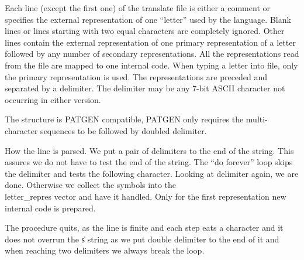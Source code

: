 Each line (except the first one) of the translate file is either a
comment or specifies the external representation of one ``letter'' used
by the language. Blank lines or lines starting with two equal characters
are completely ignored. Other lines contain the external representation
of one primary representation of a letter followed by any number of
secondary representations. All the representations read from the file
are mapped to one internal code. When typing a letter into file, only
the primary representation is used. The representations are preceded and
separated by a delimiter. The delimiter may be any 7-bit ASCII character
not occurring in either version.

The structure is PATGEN compatible, PATGEN only requires the multi-character
sequences to be followed by doubled delimiter.

How the line is parsed. We put a pair of delimiters to the end of the
string. This assures we do not have to test the end of the string.
The ``do forever'' loop skips the delimiter and tests the following
character. Looking at delimiter again, we are done. Otherwise we collect
the symbols into the \\{letter\_repres} vector and have it handled. Only
for the first representation new internal code is prepared.

The procedure quits, as the line is finite and each step eats a
character and it does not overrun the \|s string as we put double
delimiter to the end of it and when reaching two delimiters we always
break the loop.

